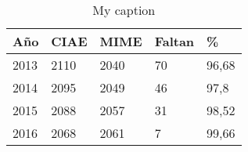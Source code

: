 


\begin{table}[]
\centering
\caption{My caption}
\label{my-label}
\begin{tabular}{|l|l|l|l|l|}
\hline
Año  & CIAE & MIME & Faltan & \%    \\ \hline
2013 & 2110 & 2040 & 70     & 96,68 \\ \hline
2014 & 2095 & 2049 & 46     & 97,8  \\ \hline
2015 & 2088 & 2057 & 31     & 98,52 \\ \hline
2016 & 2068 & 2061 & 7      & 99,66 \\ \hline
\end{tabular}
\end{table}